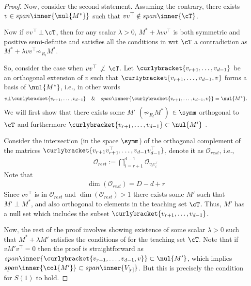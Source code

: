 \begin{proof}
    Now, consider the second statement. Assuming the contrary, there exists $v \in span \inner{\nul{M^*}}$ such that $vv^{\top} \notin span \inner{\cT}$.

    Now if $vv^{\top}\, \bot\, \cT$, then for any scalar $\lambda > 0$, $M^* + \lambda vv^{\top}$ is both symmetric and positive semi-definite and satisfies all the conditions in  wrt $\cT$ a contradiction as $M^* + \lambda vv^{\top} \not\sim_{R_l} M^*$. 
    
    So, consider the case when $vv^{\top}\, \not\perp\, \cT$. Let $\curlybracket{v_{r+1},\ldots,v_{d-1}}$ be an orthogonal extension of $v$ such that $\curlybracket{v_{r+1},\ldots,v_{d-1}, v}$ forms a basis of $\nul{M^*}$, i.e., in other words 
    \begin{align*}
    v \bot \curlybracket{v_{r+1},\ldots,v_{d-1}}\quad \&\quad span \inner{\curlybracket{v_{r+1},\ldots,v_{d-1}, v}} = \nul{M^*}.
    \end{align*}
    We will first show that there exists some $M'$ $(\not \sim_{R_l} M^*)$ $\in \symm$ orthogonal to $\cT$ and furthermore $\curlybracket{v_{r+1},\ldots,v_{d-1}} \subset \nul{M'}$ . 
    
    
    Consider the intersection (in the space $\symm$) of the orthogonal complement of the matrices $\curlybracket{v_{r+1}v_{r+1}^{\top},\ldots,v_{d-1}v_{d-1}^{\top}}$, denote it as $\mathcal{O}_{rest}$, i.e.,
    \begin{align*}
        \mathcal{O}_{rest} := \bigcap_{i = r+1}^{d-1} \mathcal{O}_{v_iv_i^{\top}} 
    \end{align*}
    Note that
    \begin{align*}
        \dim(\mathcal{O}_{rest}) = D - d + r
    \end{align*}
    Since $vv^{\top}$ is in $\mathcal{O}_{rest}$ and $\dim(\mathcal{O}_{rest}) > 1$ there exists some $M'$ such that $M' \perp M^*$, and also orthogonal to elements in the teaching set $\cT$. Thus, $M'$ has a null set which includes the subset $\curlybracket{v_{r+1},\ldots,v_{d-1}}$. 
    
    Now, the rest of the proof involves showing existence of some scalar $\lambda > 0$ such that $M^* + \lambda M'$ satisfies the conditions of  for the teaching set $\cT$. Note that if $vM'v^{\top} = 0$ then the proof is straightforward as $ span \inner{\curlybracket{v_{r+1},\ldots,v_{d-1}, v}} \subset \nul{M'}$, which implies $span \inner{\col{M'}} \subset span \inner{V_{[r]}}$. But this is precisely the condition for $S(1)$ to hold. 
    

\end{proof}

